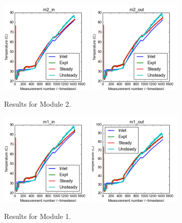 \documentclass{article}
\begin{document}
\clearpage
\begin{figure}[!ht]
\centering
\includegraphics[width=0.4\textwidth]{../../data/ICSolar/images/Mar06_m2_in_compare.png}\hspace{0.05\textwidth}
\includegraphics[width=0.4\textwidth]{../../data/ICSolar/images/Mar06_m2_out_compare.png}\hspace{0.05\textwidth}\\
\caption{Results for Module 2.}\end{figure}
\begin{figure}[!ht]
\centering
\includegraphics[width=0.4\textwidth]{../../data/ICSolar/images/Mar06_m1_in_compare.png}\hspace{0.05\textwidth}
\includegraphics[width=0.4\textwidth]{../../data/ICSolar/images/Mar06_m1_out_compare.png}\hspace{0.05\textwidth}\\
\caption{Results for Module 1.}\end{figure}
\end{document}
